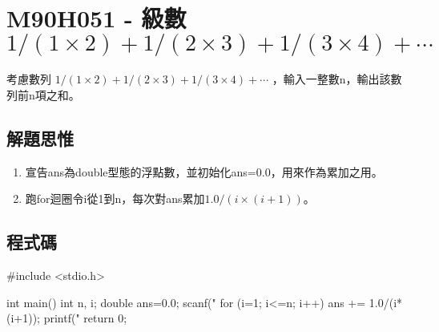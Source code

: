 \section{M90H051 - 級數 $1/(1\times 2)+1/(2\times 3)+1/(3\times 4)+\cdots$}
考慮數列 $1/(1\times 2)+1/(2\times 3)+1/(3\times 4)+\cdots$
，輸入一整數n，輸出該數列前n項之和。
\subsection{解題思惟}
\begin{enumerate}
	\item 宣告ans為double型態的浮點數，並初始化ans=0.0，用來作為累加之用。
	\item 跑for迴圈令i從1到n，每次對ans累加$1.0/(i\times(i+1))$。
\end{enumerate}
\subsection{程式碼}
\begin{cppcode}
	#include <stdio.h>
	
	int main()
	{
		int n, i;
		double ans=0.0;
		scanf("%
		for (i=1; i<=n; i++) {
			ans += 1.0/(i*(i+1));
		}
		printf("%
		return 0;
	}
	
\end{cppcode}

